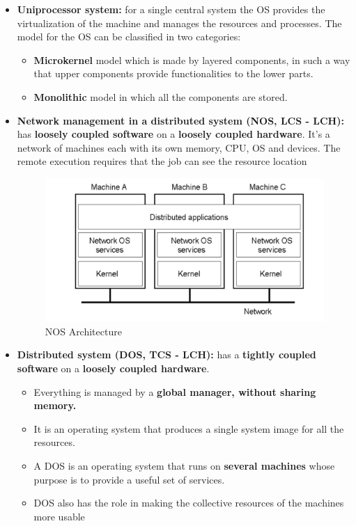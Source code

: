 \begin{itemize}
    \item \textbf{Uniprocessor system:} for a single central system the OS provides the virtualization of the machine and manages the resources and processes. The model for the OS can be classified in two categories:
    \begin{itemize}
        \item \textbf{Microkernel} model which is made by layered components, in such a way that upper components provide functionalities to the lower parts.
        \item \textbf{Monolithic} model in which all the components are stored.
    \end{itemize}
    \item \textbf{Network management in a distributed system (NOS, LCS - LCH):}  has \textbf{loosely coupled software} on a \textbf{loosely coupled hardware}. It’s a network of machines each with its own memory, CPU, OS and devices. The remote execution requires that the job can see the resource location
    \begin{figure}[!h]
            \centering
            \includegraphics[width=.6\linewidth]{images/distributedSystem/NOSArchitecture.jpeg}
            \caption{NOS Architecture}
    \end{figure}
    \item \textbf{Distributed system (DOS, TCS - LCH):} has a \textbf{tightly coupled software} on a \textbf{loosely coupled hardware}. 
    \begin{itemize}
        \item Everything is managed by a \textbf{global manager, without sharing memory.}
        \item It is an operating system that produces a single system image for all the resources.
        \item A DOS is an operating system that runs on \textbf{several machines} whose purpose is to provide a useful set of services.
        \item DOS also has the role in making the collective resources of the machines more usable

\end{itemize}
\end{itemize}
